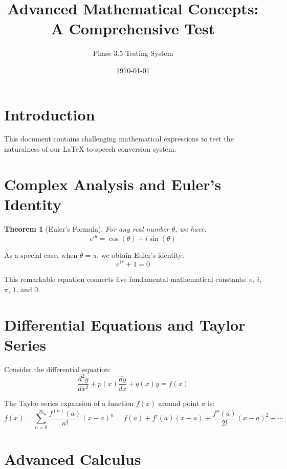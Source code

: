 \documentclass{article}
\title{Advanced Mathematical Concepts: A Comprehensive Test}
\author{Phase 3.5 Testing System}
\date{\today}
\newtheorem{theorem}{Theorem}
\begin{document}
\maketitle

\section{Introduction}
This document contains challenging mathematical expressions to test the naturalness of our LaTeX to speech conversion system.

\section{Complex Analysis and Euler's Identity}

\begin{theorem}[Euler's Formula]
For any real number $\theta$, we have:
\begin{equation}
e^{i\theta} = \cos(\theta) + i\sin(\theta)
\end{equation}
\end{theorem}

As a special case, when $\theta = \pi$, we obtain Euler's identity:
\begin{equation}
e^{i\pi} + 1 = 0
\end{equation}

This remarkable equation connects five fundamental mathematical constants: $e$, $i$, $\pi$, $1$, and $0$.

\section{Differential Equations and Taylor Series}

Consider the differential equation:
\begin{equation}
\frac{d^2y}{dx^2} + p(x)\frac{dy}{dx} + q(x)y = f(x)
\end{equation}

The Taylor series expansion of a function $f(x)$ around point $a$ is:
\begin{equation}
f(x) = \sum_{n=0}^{\infty} \frac{f^{(n)}(a)}{n!}(x-a)^n = f(a) + f'(a)(x-a) + \frac{f''(a)}{2!}(x-a)^2 + \cdots
\end{equation}

\section{Advanced Calculus}
\end{document}
